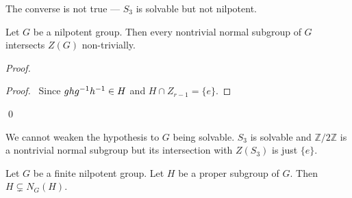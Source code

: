 \begin{ex}
The converse is not true --- $S_3$ is solvable but not nilpotent.
\end{ex}

\begin{prop}
Let $G$ be a nilpotent group. Then every nontrivial normal subgroup of $G$ intersects $Z(G)$ non-trivially.
\end{prop}

\begin{proof}
\pf
{}
\begin{proof}
	\pf\ Since $gh{g}^{-1}{h}^{-1} \in H$ and $H \cap Z_{r-1} = \{e\}$.
\end{proof}
\qed
\end{proof}

\begin{ex}
We cannot weaken the hypothesis to $G$ being solvable.
$S_3$ is solvable and $\mathbb{Z} / 2 \mathbb{Z}$ is a nontrivial normal subgroup but its intersection with $Z(S_3)$ is just $\{e\}$.
\end{ex}

\begin{prop}
\label{prop:H-sub-NGH}
Let $G$ be a finite nilpotent group. Let $H$ be a proper subgroup of $G$. Then $H \subsetneq N_G(H)$.
\end{prop}

